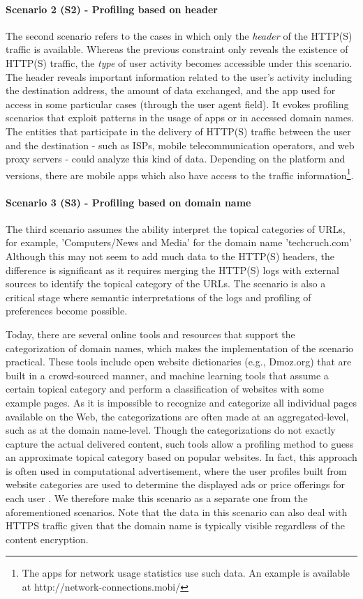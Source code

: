 \paragraph{Scenario 2 (S2) - Profiling based on header} 
The second scenario refers to the cases in which only the \textit{header} of the HTTP(S) traffic is available. Whereas the previous constraint only reveals the existence of HTTP(S) traffic, the \textit{type} of user activity becomes accessible under this scenario. The header reveals important information related to the user's activity including the destination address, the amount of data exchanged, and the app used for access in some particular cases (through the user agent field). It evokes profiling scenarios that exploit patterns in the usage of apps or in accessed domain names. The entities that participate in the delivery of HTTP(S) traffic between the user and the destination - such as ISPs, mobile telecommunication operators, and web proxy servers - could analyze this kind of data. Depending on the  platform and versions, there are mobile apps which also have access to the traffic information\footnote{The apps for network usage statistics use such data. An example is available at http://network-connections.mobi/}. 

\paragraph{Scenario 3 (S3) - Profiling based on domain name} 
The third scenario assumes the ability interpret the topical categories of URLs, for example, 'Computers/News and Media' for the domain name 'techcruch.com' Although this may not seem to add much data to the HTTP(S) headers, the difference is significant as it requires merging the HTTP(S) logs with external sources to identify the topical category of the URLs. The scenario is also a critical stage where semantic interpretations of the logs and profiling of preferences become possible. 

Today, there are several online tools and resources that support the categorization of domain names, which makes the implementation of the scenario practical. These tools include open website dictionaries (e.g., Dmoz.org) that are built in a crowd-sourced manner, and machine learning tools that assume a certain topical category and perform a classification of websites with some example pages. As it is impossible to recognize and categorize all individual pages available on the Web, the categorizations are often made at an aggregated-level, such as at the domain name-level. Though the categorizations do not exactly capture the actual delivered content, such tools allow a profiling method to guess an approximate topical category based on popular websites. In fact, this approach is often used in computational advertisement, where the user profiles built from website categories are used to determine the displayed ads or price offerings for each user \cite{castelluccia2014selling}. We therefore make this scenario as a separate one from the aforementioned scenarios. Note that the data in this scenario can also deal with HTTPS traffic given that the domain name is typically visible regardless of the content encryption. 

